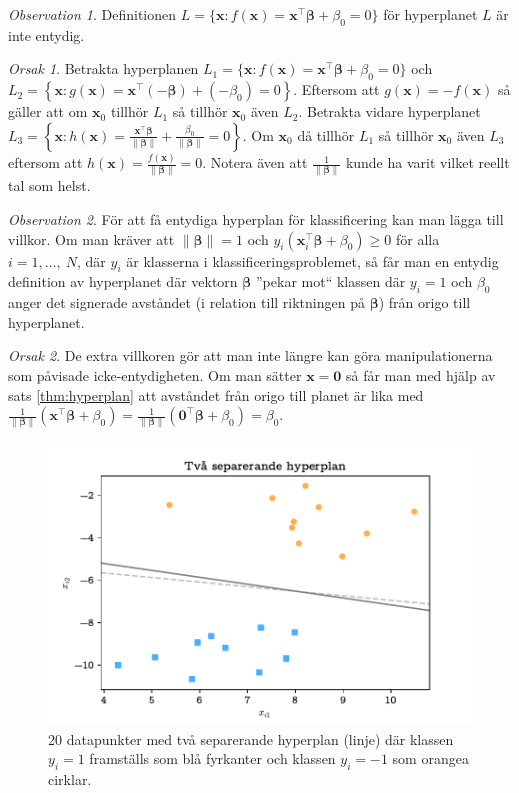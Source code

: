 \documentclass[a4paper, 12pt]{report}
\theoremstyle{definition}
\theoremstyle{remark}
\newtheorem*{rem}{Observation}
\newtheorem*{reas}{Orsak}
\newcommand{\bfbeta}{{\boldsymbol{\beta}}}
\newcommand{\sephyp}{\{ \mathbf{x} : f(\mathbf{x})=\mathbf{x}^\intercal \bfbeta + \beta_0=0\}}
\begin{document}
\begin{rem}
	Definitionen $L=\{ \mathbf{x} : f(\mathbf{x})=\mathbf{x}^\intercal \bfbeta + \beta_0=0\}$ för hyperplanet $L$ är inte entydig.
\end{rem}
\begin{reas}
	Betrakta hyperplanen $L_1 = \sephyp$ och $L_2 = \left\{\mathbf{x}: g(\mathbf{x})=\mathbf{x}^\intercal(-\bfbeta) + (-\beta_0) = 0\right\}$. Eftersom att $g(\mathbf{x}) = -f(\mathbf{x})$ så gäller att om $\mathbf{x}_0$ tillhör $L_1$ så tillhör $\mathbf{x}_0$ även $L_2$.
	Betrakta vidare hyperplanet $L_3= \left\{\mathbf{x}: h(\mathbf{x})=\frac{\mathbf{x}^\intercal\bfbeta}{\|\bfbeta\|} + \frac{\beta_0}{\|\bfbeta\|}=0\right\}$. Om $\mathbf{x}_0$ då tillhör $L_1$ så tillhör $\mathbf{x}_0$ även $L_3$ eftersom att $h(\mathbf{x}) = \frac{f(\mathbf{x})}{\|\bfbeta\|}=0$. Notera även att $\frac{1}{\|\bfbeta\|}$ kunde ha varit vilket reellt tal som helst.
\end{reas}

\begin{rem}
	För att få entydiga hyperplan för klassificering kan man lägga till villkor. Om man kräver att $\|\bfbeta\|=1$ och $y_i(\mathbf{x}_i^\intercal\bfbeta + \beta_0)\geq0$ för alla $i=1,\dots,~N$, där $y_i$ är klasserna i klassificeringsproblemet, så får man en entydig definition av hyperplanet där vektorn $\bfbeta$ ''pekar mot`` klassen där $y_i=1$ och $\beta_0$ anger det signerade avståndet (i relation till riktningen på $\bfbeta$) från origo till hyperplanet.
\end{rem}
\begin{reas}
	De extra villkoren gör att man inte längre kan göra manipulationerna som påvisade icke-entydigheten. Om man sätter $\mathbf{x}=\mathbf{0}$ så får man med hjälp av sats \ref{thm:hyperplan} att avståndet från origo till planet är lika med $\frac{1}{\|\bfbeta\|}(\mathbf{x}^\intercal\bfbeta+\beta_0)=\frac{1}{\|\bfbeta\|}\left(\mathbf{0}^\intercal\bfbeta+\beta_0\right)=\beta_0$.
\end{reas}

\begin{figure}[h]
\centering
\includegraphics[width=0.8\linewidth, trim={0.5cm 2mm 0.5cm 6mm}, clip]{KandFigur1.pdf}
\caption{\label{fig:separatinghyperplane}20 datapunkter med två separerande hyperplan (linje) där klassen $y_i=1$ framställs som blå fyrkanter och klassen $y_i=-1$ som orangea cirklar.}
\end{figure}
\end{document}
